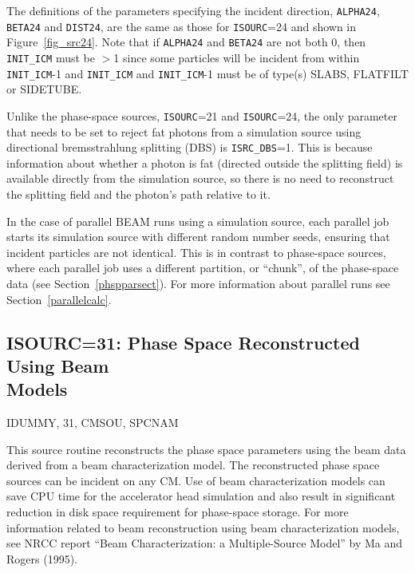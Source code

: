 \documentclass[12pt,twoside]{article}
\newcommand{\cen}[1]{\begin{center} #1 \end{center}                   }
\begin{document}
The definitions of the parameters specifying the incident direction, {\tt ALPHA24}, {\tt BETA24} and {\tt DIST24}, are the same as those
for {\tt ISOURC}=24 and shown in Figure~\ref{fig_src24}.  Note that if {\tt ALPHA24} and {\tt BETA24} are
not both 0, then {\tt INIT\_ICM} must be $>$1 since some particles will be incident from within
{\tt INIT\_ICM}-1 and {\tt INIT\_ICM} and {\tt INIT\_ICM}-1 must be of type(s) SLABS, FLATFILT or SIDETUBE.

Unlike the phase-space sources, {\tt ISOURC}=21 and {\tt ISOURC}=24, the only parameter
that needs to be set to reject fat photons from a simulation source using directional bremsstrahlung
splitting (DBS) is {\tt ISRC\_DBS}=1.  This is because information about whether a photon is fat
(directed outside the splitting field) is available directly from the simulation source, so there
is no need to reconstruct the splitting field and the photon's path relative to it.

In the case of parallel BEAM runs using a simulation source, each parallel job starts its simulation
source with different random number seeds, ensuring that incident particles are not identical.  This
is in contrast to phase-space sources, where each parallel job uses a different partition, or ``chunk'',
of the phase-space data (see Section~\ref{phspparsect}).
For more information about parallel runs see Section~\ref{parallelcalc}.

\clearpage

\subsection{ISOURC=31: Phase Space Reconstructed Using Beam\\ Models}
\label{Source31}

\cen{IDUMMY, 31, CMSOU, SPCNAM}


This source routine reconstructs the phase space parameters using the beam data
derived from a beam characterization model.  The reconstructed phase space
sources can be incident on any CM.  Use of beam characterization models can
save CPU time for the accelerator head simulation and also result in
significant reduction in disk space requirement for phase-space storage.  For
more information related to beam reconstruction using beam characterization
models, see NRCC report ``Beam Characterization: a Multiple-Source Model'' by
Ma and Rogers (1995).
\end{document}
